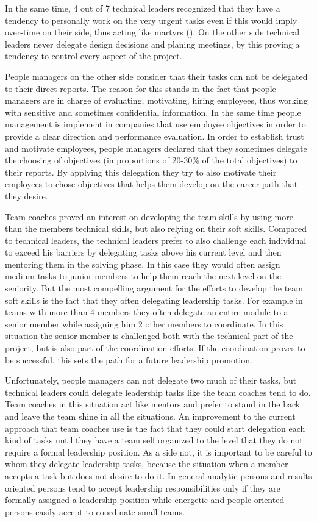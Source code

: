 In the same time, 4 out of 7 technical leaders recognized that they have a tendency to personally work on the very urgent tasks even if this would imply over-time on their side, thus acting like martyrs (\cite{toxic}). On the other side technical leaders never delegate design decisions and planing meetings, by this proving a tendency to control every aspect of the project. 

People managers on the other side consider that their tasks can not be delegated to their direct reports. The reason for this stands in the fact that people managers are in charge of evaluating, motivating, hiring employees, thus working with sensitive and sometimes confidential information. In the same time people management is implement in companies that use employee objectives in order to provide a clear direction and performance evaluation. In order to establish trust and motivate employees, people managers declared that they sometimes delegate the choosing of objectives (in proportions of 20-30\% of the total objectives) to their reports. By applying this delegation they try to also motivate their employees to chose objectives that helps them develop on the career path that they desire.

Team coaches proved an interest on developing the team skills by using more than the members technical skills, but also relying on their soft skills. Compared to technical leaders, the technical leaders prefer to also challenge each individual to exceed his barriers by delegating tasks above his current level and then mentoring them in the solving phase. In this case they would often assign medium tasks to junior members to help them reach the next level on the seniority. But the most compelling argument for the efforts to develop the team soft skills is the fact that they often delegating leadership tasks. For example in teams with more than 4 members they often delegate an entire module to a senior member while assigning him 2 other members to coordinate. In this situation the senior member is challenged both with the technical part of the project, but is also part of the coordination efforts. If the coordination proves to be successful, this sets the path for a future leadership promotion.

Unfortunately, people managers can not delegate two much of their tasks, but technical leaders could delegate leadership tasks like the team coaches tend to do. Team coaches in this situation act like mentors and prefer to stand in the back and leave the team shine in all the situations. An improvement to the current approach that team coaches use is the fact that they could start delegation each kind of tasks until they have a team self organized to the level that they do not require a formal leadership position. As a side not, it is important to be careful to whom they delegate leadership tasks, because the situation when a member accepts a task but does not desire to do it. 
In general analytic persons and results oriented persons tend to accept leadership responsibilities only if they are formally assigned a leadership position while energetic and people oriented persons easily accept to coordinate small teams.

